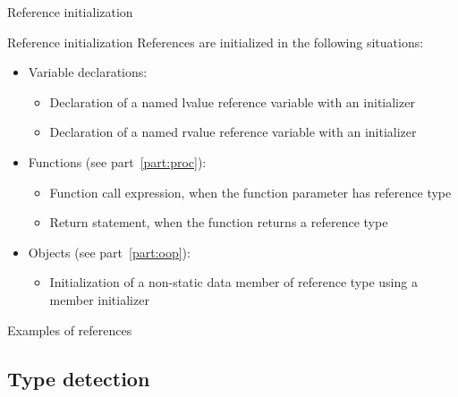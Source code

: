 \begin{frame}{Reference initialization}{}
  \begin{block}{Reference initialization}
    References are initialized in the following situations:
    \begin{itemize}
    \item
      Variable declarations:
      \begin{itemize}
      \item
        Declaration of a named lvalue reference variable with an initializer
      \item
        Declaration of a named rvalue reference variable with an initializer
      \end{itemize}
    \item
      Functions (see part~\ref{part:proc}):
      \begin{itemize}
      \item
        Function call expression, when the function parameter has reference type
      \item
        Return statement, when the function returns a reference type
      \end{itemize}
    \item
      Objects (see part~\ref{part:oop}):
      \begin{itemize}
      \item
         Initialization of a non-static data member of reference type using a member initializer
      \end{itemize}
    \end{itemize}
  \end{block}
\end{frame}


\begin{frame}{Examples of references}{}
  \begin{examples}[References]
    \small
  \end{examples}
\end{frame}


\subsection{Type detection}

